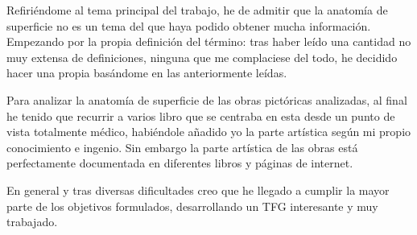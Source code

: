 Refiriéndome al tema principal del trabajo, he de admitir que la anatomía de superficie no es un tema del que haya podido obtener mucha información. Empezando por la propia definición del término: tras haber leído una cantidad no muy extensa de definiciones, ninguna que me complaciese del todo, he decidido hacer una propia basándome en las anteriormente leídas.

Para analizar la anatomía de superficie de las obras pictóricas analizadas, al final he tenido que recurrir a varios libro que se centraba en esta desde un punto de vista totalmente médico, habiéndole añadido yo la parte artística según mi propio conocimiento e ingenio. Sin embargo la parte artística de las obras está perfectamente documentada en diferentes libros y páginas de internet.

En general y tras diversas dificultades %
creo que he llegado a cumplir la mayor parte de los objetivos formulados, desarrollando un TFG interesante y muy trabajado.